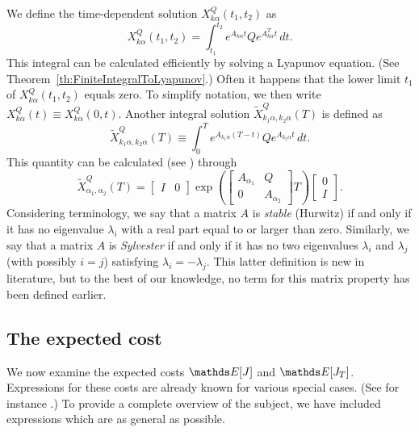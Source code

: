 \documentclass[twocolumn]{autart}
\begin{document}
We define the time-dependent solution $X_{k\alpha}^Q(t_1,t_2)$ as
\begin{equation}
X^Q_{k\alpha}(t_1,t_2) = \int_{t_1}^{t_2} e^{A_{k\alpha} t} Q e^{A_{k\alpha}^T t} \, dt. \label{eq:XQTDefinition}
\end{equation}
This integral can be calculated efficiently by solving a Lyapunov equation. (See Theorem~\ref{th:FiniteIntegralToLyapunov}.) Often it happens that the lower limit $t_1$ of $X_{k\alpha}^Q(t_1,t_2)$ equals zero. To simplify notation, we then write $X_{k\alpha}^Q(t) \equiv X_{k\alpha}^Q(0,t)$. Another integral solution $\tilde{X}_{k_1\alpha,k_2\alpha}^Q(T)$ is defined as
\begin{equation}
\tilde{X}_{k_1\alpha,k_2\alpha}^Q(T) \equiv \int_0^T e^{A_{k_1\alpha} (T-t)} Q e^{A_{k_2\alpha} t} \, dt.
\end{equation}
This quantity can be calculated (see \cite{MatrixExponentials}) through
\begin{equation}
\tilde{X}_{\alpha_1,\alpha_2}^Q(T) = \begin{bmatrix}
I & 0
\end{bmatrix} \exp\left(\begin{bmatrix}
A_{\alpha_1} & Q \\
0 & A_{\alpha_2}
\end{bmatrix} T\right) \begin{bmatrix}
0 \\
I
\end{bmatrix}. \label{eq:CalculatingXTilde}
\end{equation}
Considering terminology, we say that a matrix $A$ is \textit{stable} (Hurwitz) if and only if it has no eigenvalue $\lambda_i$ with a real part equal to or larger than zero. Similarly, we say that a matrix $A$ is \textit{Sylvester} if and only if it has no two eigenvalues $\lambda_i$ and $\lambda_j$ (with possibly $i = j$) satisfying $\lambda_i = -\lambda_j$. This latter definition is new in literature, but to the best of our knowledge, no term for this matrix property has been defined earlier.

\subsection{The expected cost}

We now examine the expected costs $\ex[J]$ and $\ex[J_T]$. Expressions for these costs are already known for various special cases. (See for instance \cite{DMCSBook,StochasticControlBook}.) To provide a complete overview of the subject, we have included expressions which are as general as possible.
\end{document}
